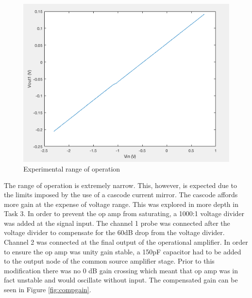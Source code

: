 		
		\begin{figure}[H]
			\begin{center}
				\includegraphics[scale=.40]{ExperimentalImplementation/VTC.png}
				\caption{Experimental range of operation}
				\label{fig:vtc}
			\end{center}
		\end{figure}
		
		The range of operation is extremely narrow. This, however, is expected due to the limits imposed by the use of a cascode current mirror. The cascode affords more gain at the expense of voltage range. This was explored in more depth in Task 3. In order to prevent the op amp from saturating, a 1000:1 voltage divider was added at the signal input. The channel 1 probe was connected after the voltage divider to compensate for the 60dB drop from the voltage divider. Channel 2 was connected at the final output of the operational amplifier.  In order to ensure the op amp was unity gain stable, a 150pF capacitor had to be added to the output node of the common source amplifier stage. Prior to this modification there was no 0 dB gain crossing which meant that op amp was in fact unstable and would oscillate without input. The compensated gain can be seen in Figure \ref{fig:compgain}.
		

